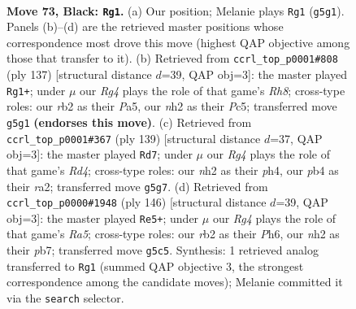 \documentclass[11pt]{article}
\begin{document}
\clearpage

\begin{figure}[p]\centering
\begin{subfigure}{0.46\textwidth}\centering
\resizebox{\linewidth}{!}{%
\newchessgame
\chessboard[
  setfen={2b5/B4k2/1K6/6r1/PP6/5B1p/1R5N/8 b - - 4 73},
  showmover=false,
  pgfstyle=straightmove, color=movearrow, markmove={g5-g1}
]}
\caption{}
\end{subfigure}\hfill
\begin{subfigure}{0.46\textwidth}\centering
\resizebox{\linewidth}{!}{%
\newchessgame
\chessboard[
  setfen={8/6k1/8/p1p3P1/3n1B2/3B2K1/N7/7r b - - 8 69},
  showmover=false,
  pgfstyle=straightmove, color=movearrow, markmove={h1-g1}
]}
\caption{}
\end{subfigure}
\\[4pt]
\begin{subfigure}{0.46\textwidth}\centering
\resizebox{\linewidth}{!}{%
\newchessgame
\chessboard[
  setfen={8/8/4k3/3r3p/1K4bP/2B5/R5P1/8 b - - 8 70},
  showmover=false,
  pgfstyle=straightmove, color=movearrow, markmove={d5-d7}
]}
\caption{}
\end{subfigure}\hfill
\begin{subfigure}{0.46\textwidth}\centering
\resizebox{\linewidth}{!}{%
\newchessgame
\chessboard[
  setfen={8/1p2r2p/2b1k2P/R7/5P2/2B5/5K2/8 w - - 19 74},
  showmover=false,
  pgfstyle=straightmove, color=movearrow, markmove={a5-e5}
]}
\caption{}
\end{subfigure}
\caption{\textbf{Move 73, Black: \texttt{Rg1}.} (a) Our position; Melanie plays \texttt{Rg1} (\texttt{g5g1}). Panels (b)--(d) are the retrieved master positions whose correspondence most drove this move (highest QAP objective among those that transfer to it). (b) Retrieved from \texttt{ccrl\_top\_p0001\#808} (ply 137) [structural distance $d$=39, QAP obj=3]: the master played \texttt{Rg1+}; under $\mu$ our \emph{Rg4} plays the role of that game's \emph{Rh8}; cross-type roles: our \emph{r}b2 as their \emph{P}a5, our \emph{n}h2 as their \emph{P}c5; transferred move \texttt{g5g1} \textbf{(endorses this move)}. (c) Retrieved from \texttt{ccrl\_top\_p0001\#367} (ply 139) [structural distance $d$=37, QAP obj=3]: the master played \texttt{Rd7}; under $\mu$ our \emph{Rg4} plays the role of that game's \emph{Rd4}; cross-type roles: our \emph{n}h2 as their \emph{p}h4, our \emph{p}b4 as their \emph{r}a2; transferred move \texttt{g5g7}. (d) Retrieved from \texttt{ccrl\_top\_p0000\#1948} (ply 146) [structural distance $d$=39, QAP obj=3]: the master played \texttt{Re5+}; under $\mu$ our \emph{Rg4} plays the role of that game's \emph{Ra5}; cross-type roles: our \emph{r}b2 as their \emph{P}h6, our \emph{n}h2 as their \emph{p}b7; transferred move \texttt{g5c5}. Synthesis: 1 retrieved analog transferred to \texttt{Rg1} (summed QAP objective 3, the strongest correspondence among the candidate moves); Melanie committed it via the \texttt{search} selector.}
\label{fig:thought-m145}
\end{figure}
\end{document}
